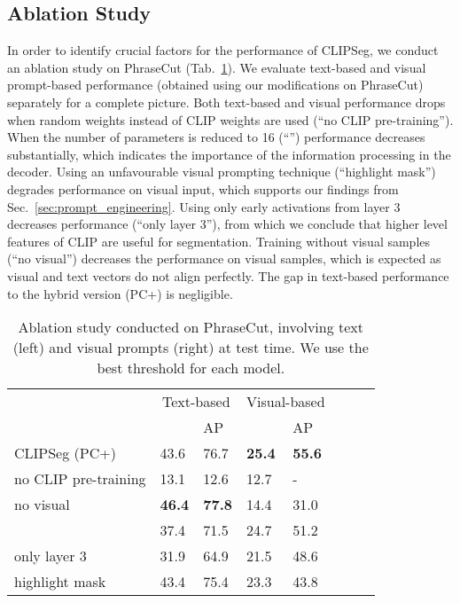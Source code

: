 \documentclass[10pt,twocolumn,letterpaper]{article}
\begin{document}
\subsection{Ablation Study}

In order to identify crucial factors for the performance of CLIPSeg, we conduct an ablation study on PhraseCut (Tab.~\ref{tab:ablation}). We evaluate text-based and visual prompt-based performance (obtained using our modifications on PhraseCut) separately for a complete picture.
Both text-based and visual performance drops when random weights instead of CLIP weights are used (``no CLIP pre-training''). When the number of parameters is reduced to 16 (``'') performance decreases substantially, which indicates the importance of the information processing in the decoder.
Using an unfavourable visual prompting technique (``highlight mask'') degrades performance on visual input, which supports our findings from Sec.~\ref{sec:prompt_engineering}. 
Using only early activations from layer 3 decreases performance (``only layer 3''), from which we conclude that higher level features of CLIP are useful for segmentation.
Training without visual samples (``no visual'') decreases the performance on visual samples, which is expected as visual and text vectors do not align perfectly. The gap in text-based performance to the hybrid version (PC+) is negligible.









\begin{table}[t]
    \centering
    \footnotesize
    \begin{tabular}{llllllll}
        \toprule
        & \multicolumn{2}{c}{Text-based} & \multicolumn{2}{c}{Visual-based} \\
         &  &  AP &  &  AP   \\
        \midrule
              CLIPSeg (PC+) &  43.6 &  76.7 &  \textbf{25.4} &  \textbf{55.6} \\
 no CLIP pre-training &  13.1 &  12.6 &  12.7 &   - \\
            no visual &  \textbf{46.4} &  \textbf{77.8} &  14.4 &  31.0 \\
                      &  37.4 &  71.5 &  24.7 &  51.2 \\
         only layer 3 &  31.9 &  64.9 &  21.5 &  48.6 \\
       highlight mask &  43.4 &  75.4 &  23.3 &  43.8 \\
        
        \bottomrule
    \end{tabular}
    \caption{Ablation study conducted on PhraseCut, involving text (left) and visual prompts (right) at test time. We use the best threshold  for each model.}
    \label{tab:ablation}
\end{table}
\end{document}
